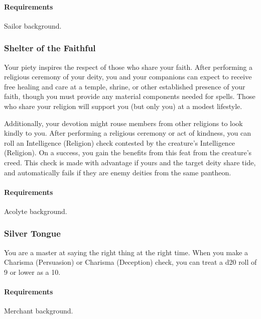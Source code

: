     \paragraph{Requirements} Sailor background.
\subsubsection{Shelter of the Faithful} \label{feat::shelterofthefaithful}
    Your piety inspires the respect of those who share your faith.
    After performing a religious ceremony of your deity, you and your companions can expect to receive free healing and care at a temple, shrine, or other established presence of your faith, though you must provide any material components needed for spells.
    Those who share your religion will support you (but only you) at a modest lifestyle.

    Additionally, your devotion might rouse members from other religions to look kindly to you.
    After performing a religious ceremony or act of kindness, you can roll an Intelligence (Religion) check contested by the creature's Intelligence (Religion).
    On a success, you gain the benefits from this feat from the creature's creed.
    This check is made with advantage if yours and the target deity share tide, and automatically fails if they are enemy deities from the same pantheon.

    \paragraph{Requirements} Acolyte background.
\subsubsection{Silver Tongue} \label{feat::silvertongue}
    You are a master at saying the right thing at the right time.
    When you make a Charisma (Persuasion) or Charisma (Deception) check, you can treat a d20 roll of 9 or lower as a 10.
    \paragraph{Requirements} Merchant background.
